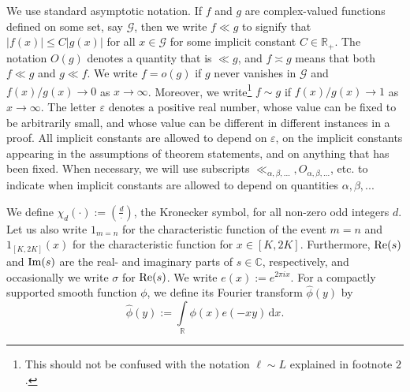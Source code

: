 \documentclass[a4paper,10pt,twoside]{amsart}
\theoremstyle{definition}
\numberwithin{equation}{section}
\newcommand\eps{\varepsilon}
\renewcommand{\Re}{\textnormal{Re}}
\renewcommand{\Im}{\textnormal{Im}}
\renewcommand\:{\colon}
\begin{document}
\noindent We use standard asymptotic notation. If $f$ and $g$ are complex-valued functions defined on some set, say $\mathcal G$, then we write $f\ll g$ to signify that $|f(x)|\leqslant C|g(x)|$ for all $x\in\mathcal G$ for some implicit constant $C\in\mathbb R_+$. The notation $O(g)$ denotes a quantity that is $\ll g$, and $f\asymp g$ means that both $f\ll g$ and $g\ll f$. We write $f=o(g)$ if $g$ never vanishes in $\mathcal G$ and $f(x)/g(x)\longrightarrow 0$ as $x\longrightarrow\infty$. Moreover, we write\footnote{This should not be confused with the notation $\ell\sim L$ explained in footnote $2$.} $f\sim g$ if $f(x)/g(x)\longrightarrow 1$ as $x\longrightarrow\infty$. The letter $\varepsilon$ denotes a positive real number, whose value can be fixed to be arbitrarily small, and whose value can be different in different instances in a proof.  All implicit constants are allowed to depend on $\varepsilon$, on the implicit constants appearing in the assumptions of theorem statements, and on anything that has been fixed. When necessary, we will use subscripts $\ll_{\alpha,\beta,...},O_{\alpha,\beta,...}$, etc. to indicate when implicit constants are allowed to depend on quantities $\alpha,\beta,...$

We define $\chi_d(\cdot):=\left(\frac d\cdot\right)$, the Kronecker symbol, for all non-zero odd integers $d$. %
Let us also write $1_{m=n}$ for the characteristic function of the event $m=n$ and $1_{[K,2K]}(x)$ for the characteristic function for $x\in[K,2K]$. Furthermore, $\Re(s)$ and $\Im(s)$ are the real- and imaginary parts of $s\in\mathbb C$, respectively, and occasionally we write $\sigma$ for $\Re(s)$. We write $e(x):=e^{2\pi ix}$. For a compactly supported smooth function $\phi$, we define its Fourier transform $\widehat\phi(y)$ by
\[
\widehat\phi(y):=\int\limits_\mathbb R \phi(x)e(-xy)\,\mathrm d x.
\]
 
\end{document}

